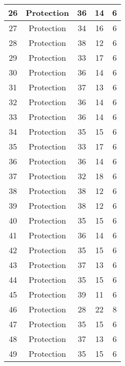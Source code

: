 \documentclass[results.tex]{subfiles}
\begin{document}
\begin{center}
\begin{tabular}{| c || c | c | c | c |}
    \hline
    26 & Protection & 36 & 14 & 6 \\ 
    \hline
    27 & Protection & 34 & 16 & 6 \\ 
    \hline
    28 & Protection & 38 & 12 & 6 \\ 
    \hline
    29 & Protection & 33 & 17 & 6 \\ 
    \hline
    30 & Protection & 36 & 14 & 6 \\ 
    \hline
    31 & Protection & 37 & 13 & 6 \\ 
    \hline
    32 & Protection & 36 & 14 & 6 \\ 
    \hline
    33 & Protection & 36 & 14 & 6 \\ 
    \hline
    34 & Protection & 35 & 15 & 6 \\ 
    \hline
    35 & Protection & 33 & 17 & 6 \\ 
    \hline
    36 & Protection & 36 & 14 & 6 \\ 
    \hline
    37 & Protection & 32 & 18 & 6 \\ 
    \hline
    38 & Protection & 38 & 12 & 6 \\ 
    \hline
    39 & Protection & 38 & 12 & 6 \\ 
    \hline
    40 & Protection & 35 & 15 & 6 \\ 
    \hline
    41 & Protection & 36 & 14 & 6 \\ 
    \hline
    42 & Protection & 35 & 15 & 6 \\ 
    \hline
    43 & Protection & 37 & 13 & 6 \\ 
    \hline
    44 & Protection & 35 & 15 & 6 \\ 
    \hline
    45 & Protection & 39 & 11 & 6 \\ 
    \hline
    46 & Protection & 28 & 22 & 8 \\ 
    \hline
    47 & Protection & 35 & 15 & 6 \\ 
    \hline
    48 & Protection & 37 & 13 & 6 \\ 
    \hline
    49 & Protection & 35 & 15 & 6 \\ 
    \hline   \end{tabular}
\end{center}
\end{document}
